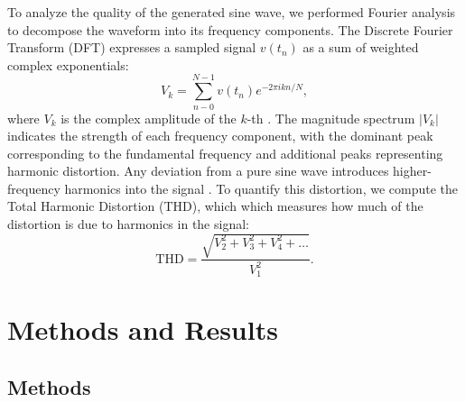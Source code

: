 \documentclass{article}
\begin{document}
\noindent To analyze the quality of the generated sine wave, we performed
Fourier analysis to decompose the waveform into its frequency components.
The Discrete Fourier Transform (DFT) expresses a sampled signal $v(t_n)$
as a sum of weighted complex exponentials:
\begin{equation}
    V_k=\sum_{n-0}^{N-1}v(t_n)e^{-2\pi ikn/N},
\end{equation}
\noindent where $V_k$ is the complex amplitude of the $k$-th \cite{bounchaleun}. The
magnitude spectrum $|V_k|$ indicates the strength of each frequency component,
with the dominant peak corresponding to the fundamental frequency and
additional peaks representing harmonic distortion. Any deviation from a pure 
sine wave introduces higher-frequency harmonics into the signal \cite{williams}\cite{heinzen}. To quantify
this distortion, we compute the Total Harmonic Distortion (THD), which
which measures how much of the distortion is due to harmonics in the signal:
\begin{equation}
    \text{THD}=\frac{\sqrt{V_2^2+V_3^2+V_4^2+ \dots}}{V_1^2}.
    \label{eq:thd}
\end{equation}



\section{Methods and Results}



\subsection{Methods}

\end{document}
